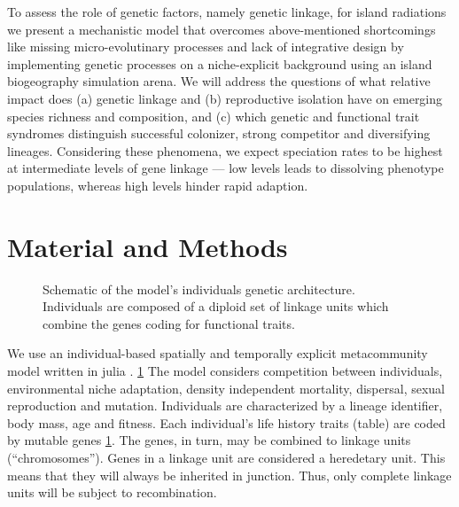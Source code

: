 \documentclass[a4paper]{scrartcl}
\begin{document}


To assess the role of genetic factors, namely genetic linkage, for island radiations
we present a mechanistic model that overcomes above-mentioned shortcomings like missing micro-evolutinary processes and lack of integrative design
by implementing genetic processes on a niche-explicit background
using an island biogeography simulation arena.
We will address the questions of what relative impact does (a) genetic linkage and
(b) reproductive isolation have on emerging species richness and composition,
and (c) which genetic and functional trait syndromes %
distinguish successful colonizer,
strong competitor and diversifying lineages.
Considering these phenomena, we expect speciation rates to be highest at intermediate levels of gene linkage --- low
levels leads to dissolving phenotype populations, whereas high levels hinder rapid adaption. %

\section{Material and Methods}

\begin{figure}
  \caption{Schematic of the model's individuals genetic architecture.
    Individuals are composed of a diploid set of linkage units which combine the genes coding for functional traits.}
  \label{fig:schematic}
\end{figure}

We use an individual-based spatially and temporally explicit metacommunity model written in julia \cite{bezansonJuliaFreshApproach2017} .  \ref{fig:schematic}
The model considers competition between individuals, environmental niche adaptation, density independent mortality,
dispersal, sexual reproduction and mutation.
Individuals are characterized by a lineage identifier,
body mass, age and fitness.
Each individual's life history traits (table) are coded by mutable genes \cref{fig:schematic}.
The genes, in turn, may be combined to linkage units (``chromosomes'').
Genes in a linkage unit are considered a heredetary unit.
This means that they will always be inherited in junction.
Thus, only complete linkage units will be subject to recombination.
\end{document}
